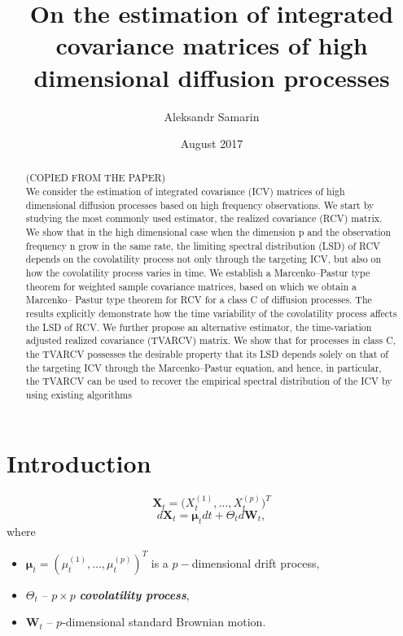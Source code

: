 \documentclass[a4paper,11pt]{article}
\title{On the estimation of integrated covariance matrices of high dimensional diffusion processes}
\author{Aleksandr Samarin}
\date{August 2017}
\theoremstyle{plain}
\theoremstyle{definition}
\newcommand{\define}[1]{\textit{\textbf{#1}}}
\begin{document}
	
	\maketitle
	
	\begin{abstract}
		(COPIED FROM THE PAPER) \\
		We consider the estimation of integrated covariance (ICV) matrices
		of high dimensional diffusion processes based on high frequency
		observations. We start by studying the most commonly used estimator,
		the realized covariance (RCV) matrix. We show that in the
		high dimensional case when the dimension p and the observation frequency
		n grow in the same rate, the limiting spectral distribution
		(LSD) of RCV depends on the covolatility process not only through
		the targeting ICV, but also on how the covolatility process varies in
		time. We establish a Marcenko–Pastur type theorem for weighted
		sample covariance matrices, based on which we obtain a Marcenko–
		Pastur type theorem for RCV for a class C of diffusion processes.
		The results explicitly demonstrate how the time variability of the
		covolatility process affects the LSD of RCV. We further propose
		an alternative estimator, the time-variation adjusted realized covariance
		(TVARCV) matrix. We show that for processes in class C, the
		TVARCV possesses the desirable property that its LSD depends
		solely on that of the targeting ICV through the Marcenko–Pastur
		equation, and hence, in particular, the TVARCV can be used to recover
		the empirical spectral distribution of the ICV by using existing
		algorithms
	\end{abstract}
	
	\section{Introduction}
	
	\[ \mathbf{X}_t = \big(X_t^{(1)}, \dots, X_t^{(p)}\big)^T \]
	\begin{equation} \label{X diffeq}
		d\mathbf{X}_t = \mathbf{\mu}_t dt + \Theta_td\mathbf{W}_t,
	\end{equation}
	where 
	\begin{itemize}
		\item $\mathbf{\mu}_t = (\mu_t^{(1)}, \dots, \mu_t^{(p)})^T$ is a $p-$dimensional drift process,
		\item $\Theta_t$ -- $p \times p$ \define{covolatility process},
		\item $\mathbf{W}_t$ -- $p$-dimensional standard Brownian motion.
	\end{itemize}
	
\end{document}
